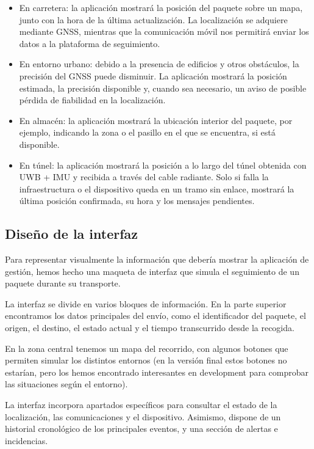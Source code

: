 \documentclass[11pt,a4paper]{article}
\begin{document}
\begin{itemize}
    \item En carretera: la aplicación mostrará la posición del paquete sobre un mapa, junto con la hora de la última actualización. La localización se adquiere mediante GNSS, mientras que la comunicación móvil nos permitirá enviar los datos a la plataforma de seguimiento.

    \item En entorno urbano: debido a la presencia de edificios y otros obstáculos, la precisión del GNSS puede disminuir. La aplicación mostrará la posición estimada, la precisión disponible y, cuando sea necesario, un aviso de posible pérdida de fiabilidad en la localización.

    \item En almacén: la aplicación mostrará la ubicación interior del paquete, por ejemplo, indicando la zona o el pasillo en el que se encuentra, si está disponible.

    \item En túnel: la aplicación mostrará la posición a lo largo del túnel obtenida con UWB + IMU y recibida a través del cable radiante. Solo si falla la infraestructura o el dispositivo queda en un tramo sin enlace, mostrará la última posición confirmada, su hora y los mensajes pendientes.
\end{itemize}

\subsection{Diseño de la interfaz}
\label{sec:apartado8_4}

Para representar visualmente la información que debería mostrar la aplicación de gestión, hemos hecho una maqueta de interfaz que simula el seguimiento de un paquete durante su transporte.

La interfaz se divide en varios bloques de información. En la parte superior encontramos los datos principales del envío, como el identificador del paquete, el origen, el destino, el estado actual y el tiempo transcurrido desde la recogida.

En la zona central tenemos un mapa del recorrido, con algunos botones que permiten simular los distintos entornos (en la versión final estos botones no estarían, pero los hemos encontrado interesantes en development para comprobar las situaciones según el entorno).

La interfaz incorpora apartados específicos para consultar el estado de la localización, las comunicaciones y el dispositivo. Asimismo, dispone de un historial cronológico de los principales eventos, y una sección de alertas e incidencias.
\end{document}
